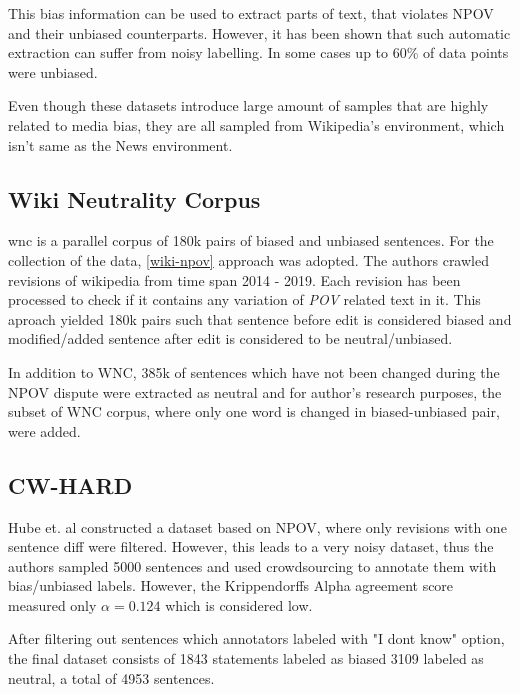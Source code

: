 This bias information can be used to extract parts of text, that violates NPOV and their unbiased counterparts. However, it has been shown \cite{hube2019neural,zhong-etal-2021-wikibias-detecting} that such automatic extraction can suffer from noisy labelling. In some cases \cite{hube2019neural} up to 60\% of data points were unbiased.

Even though these datasets introduce large amount of samples that are highly related to media bias, they are all sampled from Wikipedia's environment, which isn't same as the News environment. 




\subsection{Wiki Neutrality Corpus}\label{wiki}
\Gls{wnc} \cite{pryzant2020automatically} is a parallel corpus of 180k pairs of biased and unbiased sentences. For the collection of the data, \ref{wiki-npov} approach was adopted. The authors crawled revisions of wikipedia from time span 2014 - 2019. Each revision has been processed to check if it contains any variation of \textit{POV} related text in it. This aproach yielded 180k pairs such that sentence before edit is considered biased and modified/added sentence after edit is considered to be neutral/unbiased.
    
In addition to WNC, 385k of sentences which have not been changed during the NPOV dispute were extracted as neutral and for author's research purposes, the subset of WNC corpus, where only one word is changed in biased-unbiased pair, were added.




\subsection{CW-HARD}
Hube et. al \cite{hube2019neural} constructed a dataset based on NPOV, where only revisions with one sentence diff were filtered. However, this leads to a very noisy dataset, thus the authors sampled 5000 sentences and used crowdsourcing to annotate them with bias/unbiased labels. However, the Krippendorffs Alpha agreement score measured only $\alpha = 0.124$ which is considered low. 

After filtering out sentences which annotators labeled with "I dont know" option, the final dataset consists of 1843 statements labeled as biased 3109 labeled as neutral, a total of 4953 sentences.

